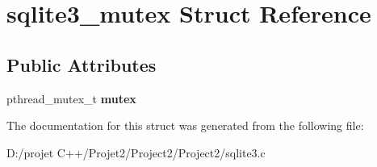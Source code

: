 \hypertarget{structsqlite3__mutex}{}\section{sqlite3\+\_\+mutex Struct Reference}
\label{structsqlite3__mutex}
\subsection*{Public Attributes}
\begin{DoxyCompactItemize}
\item 
\mbox{\label{structsqlite3__mutex_a6eef25bee73a3640dbbd052d707dbfdc}} 
pthread\+\_\+mutex\+\_\+t {\bfseries mutex}
\end{DoxyCompactItemize}


The documentation for this struct was generated from the following file\+:\begin{DoxyCompactItemize}
\item 
D\+:/projet C++/\+Projet2/\+Project2/\+Project2/sqlite3.\+c\end{DoxyCompactItemize}
